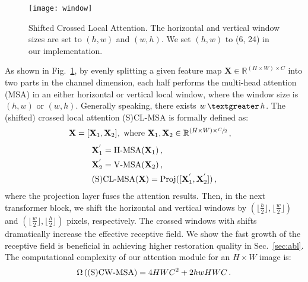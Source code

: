 \documentclass[runningheads]{llncs}
\begin{document}
	\begin{figure}[t]
		\begin{center}
			\texttt{[image: window]}
		\end{center}
\caption{Shifted Crossed Local Attention. The horizontal and vertical window sizes are set to $(h, w)$ and $(w, h)$. We set $(h, w)$ to (6, 24) in our implementation.}
		\vspace{-0.2in}
		\label{fig:att}
	\end{figure}
	
	As shown in Fig.~\ref{fig:att}, by evenly splitting a given feature map $ \mathbf{X} \in {\mathbb R}^{(H \times W) \times C}$ into two parts in the channel dimension, each half performs the multi-head attention (MSA) in an either horizontal or vertical local window, where the window size is $(h, w)$ or $(w, h)$. Generally speaking, there exists $w \, \textgreater \, h$. The (shifted) crossed local attention (S)CL-MSA is formally defined as:
	\begin{align}
	& \mathbf{X} = [ \mathbf{X}_{1}, \mathbf{X}_{2} ], \ {\rm where} \ \mathbf{X}_{1}, \mathbf{X}_{2} \in {\mathbb R}^{(H \times W) \times \sfrac{C}{2}} \,,
	\end{align}
	\begin{align}
	& \mathbf{X}_{1}^{'} = {\rm H\text{-}MSA} (\mathbf{X}_{1}) \,, \\
	& \mathbf{X}_{2}^{'} = {\rm V\text{-}MSA} (\mathbf{X}_{2}) \,, \\
	& {\rm (S)CL\text{-}MSA} (\mathbf{X}) = {\rm Proj}([ \mathbf{X}_{1}^{'}, \mathbf{X}_{2}^{'} ]) \,,
	\end{align}
where the projection layer fuses the attention results. Then, in the next transformer block, we shift the horizontal and vertical windows by $(\lfloor \frac{h}{2} \rfloor, \lfloor \frac{w}{2} \rfloor)$ and $(\lfloor \frac{w}{2} \rfloor, \lfloor \frac{h}{2} \rfloor)$ pixels, respectively. The crossed windows with shifts dramatically increase the effective receptive field. We show the fast growth of the receptive field is beneficial in achieving higher restoration quality in Sec.~\ref{sec:abl}. The computational complexity of our attention module for an $H \times W$ image is:
	\begin{align}
	\Omega \left({\rm (S)CW\text{-}MSA} \right) = 4HWC^{2}+ 2hwHWC \,.
	\end{align}
\end{document}
